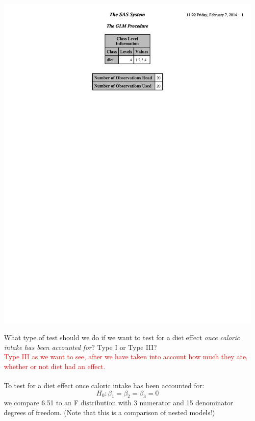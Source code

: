 \begin{flushleft}
\includegraphics[page=3,scale=0.5,trim = 5mm 150mm 5mm 5mm]{DietsANCOVA}
\end{flushleft}

\newpage

What type of test should we do if we want to test for a diet effect \textit{once caloric intake has been accounted for}? Type I or Type III?%
\textcolor{red}{\\Type III as we want to see, after we have taken into account how much they ate, whether or not diet had an effect.}\\~\\

To test for a diet effect once caloric intake has been accounted for: 
$$H_0: \beta_1 = \beta_2 = \beta_3 =0$$
we compare 6.51 to an F distribution with 3 numerator and 15 denominator degrees of freedom.  (Note that this is a comparison of nested models!)\\~\\

